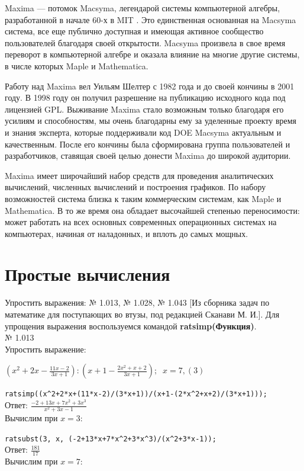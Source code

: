 \documentclass[article, bachelor, och, pract]{SCWorks}
\begin{document}
Maxima — потомок Macsyma, легендарой системы компьютерной алгебры, разработанной в начале 60-х в MIT . Это единственная основанная на Macsyma система, все еще публично доступная и имеющая активное сообщество пользователей благодаря своей открытости. Macsyma произвела в свое время переворот в компьютерной алгебре и оказала влияние на многие другие системы, в числе которых Maple и Mathematica.

Работу над Maxima вел Уильям Шелтер с 1982 года и до своей кончины в 2001 году. В 1998 году он получил разрешение на публикацию исходного кода  под лицензией GPL. Выживание Maxima стало возможным только благодаря его усилиям и способностям, мы очень благодарны ему за уделенные проекту время и знания эксперта, которые поддерживали код DOE Macsyma актуальным и качественным. После его кончины была сформирована группа пользователей и разработчиков, ставящая своей целью донести Maxima до широкой аудитории.

Maxima имеет широчайший набор средств для проведения аналитических вычислений, численных вычислений и построения графиков. По набору возможностей система близка к таким коммерческим системам, как Maple и Mathematica. В то же время она обладает высочайшей степенью переносимости: может работать на всех основных современных операционных системах на компьютерах, начиная от наладонных, и вплоть до самых мощных.

\section{Простые вычисления}
Упростить выражения: № 1.013, № 1.028, № 1.043 [Из сборника задач по математике для поступающих во втузы, под редакцией Сканави М. И.]. Для упрощения выражения воспользуемся командой \textbf{ratsimp(Функция)}.
\\

№ 1.013\\
Упростить выражение:

$(x^2+2x-\frac{11x-2}{3x+1}):(x+1-\frac{2x^2+x+2}{3x+1}); \; \; x=7,(3)$

\texttt{ratsimp((x\^{}2+2*x+(11*x-2)/(3*x+1))/(x+1-(2*x\^{}2+x+2)/(3*x+1)));}\\
Ответ: $\frac{-2+13x+7x^2+3x^3}{x^2+3x-1}$
\\
Вычислим при $x = 3:$

\texttt{ratsubst(3, x, (-2+13*x+7*x\^{}2+3*x\^{}3)/(x\^{}2+3*x-1));}\\
Ответ: $\frac{181}{17}$
\\
Вычислим при $x = 7:$
\end{document}
